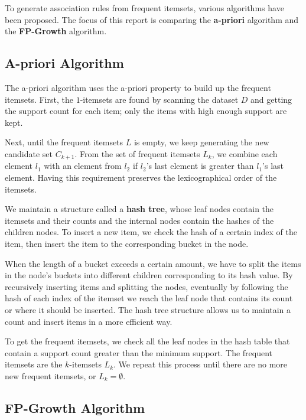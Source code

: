 \documentclass[
  paper=a4,
,captions=tableheading
]{scrartcl}
\begin{document}
To generate association rules from frequent itemsets, various algorithms
have been proposed. The focus of this report is comparing the
\textbf{a-priori} algorithm and the \textbf{FP-Growth} algorithm.

\hypertarget{a-priori-algorithm}{%
\subsection{A-priori Algorithm}\label{a-priori-algorithm}}

The a-priori algorithm uses the a-priori property to build up the
frequent itemsets. First, the \(1\)-itemsets are found by scanning the
dataset \(D\) and getting the support count for each item; only the
items with high enough support are kept.

Next, until the frequent itemsets \(L\) is empty, we keep generating the
new candidate set \(C_{k+1}\). From the set of frequent itemsets
\(L_{k}\), we combine each element \(l_{1}\) with an element from
\(l_{2}\) if \(l_{2}\)'s last element is greater than \(l_{1}\)'s last
element. Having this requirement preserves the lexicographical order of
the itemsets.

We maintain a structure called a \textbf{hash tree}, whose leaf nodes
contain the itemsets and their counts and the internal nodes contain the
hashes of the children nodes. To insert a new item, we check the hash of
a certain index of the item, then insert the item to the corresponding
bucket in the node.

When the length of a bucket exceeds a certain amount, we have to split
the items in the node's buckets into different children corresponding to
its hash value. By recursively inserting items and splitting the nodes,
eventually by following the hash of each index of the itemset we reach
the leaf node that contains its count or where it should be inserted.
The hash tree structure allows us to maintain a count and insert items
in a more efficient way.

To get the frequent itemsets, we check all the leaf nodes in the hash
table that contain a support count greater than the minimum support. The
frequent itemsets are the \(k\)-itemsets \(L_{k}\). We repeat this
process until there are no more new frequent itemsets, or
\(L_{k} = \emptyset\).

\hypertarget{fp-growth-algorithm}{%
\subsection{FP-Growth Algorithm}\label{fp-growth-algorithm}}
\end{document}

